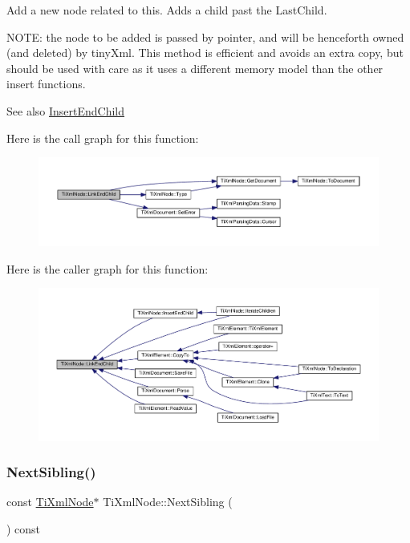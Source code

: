 Add a new node related to this. Adds a child past the Last\+Child.

N\+O\+TE\+: the node to be added is passed by pointer, and will be henceforth owned (and deleted) by tiny\+Xml. This method is efficient and avoids an extra copy, but should be used with care as it uses a different memory model than the other insert functions.

\begin{DoxySeeAlso}{See also}
\hyperlink{class_ti_xml_node_af287a913ce46d8dbf7ef24fec69bbaf0}{Insert\+End\+Child} 
\end{DoxySeeAlso}
Here is the call graph for this function\+:
\nopagebreak
\begin{figure}[H]
\begin{center}
\leavevmode
\includegraphics[width=350pt]{class_ti_xml_node_a1a881212554b759865f6cac79a851d38_cgraph}
\end{center}
\end{figure}
Here is the caller graph for this function\+:
\nopagebreak
\begin{figure}[H]
\begin{center}
\leavevmode
\includegraphics[width=350pt]{class_ti_xml_node_a1a881212554b759865f6cac79a851d38_icgraph}
\end{center}
\end{figure}
\mbox{\label{class_ti_xml_node_ae99c572ac7901a15993ea7a4efaa10e7}} 
\subsubsection{\texorpdfstring{Next\+Sibling()}{NextSibling()}\hspace{0.1cm}{\footnotesize\ttfamily [1/4]}}
{\footnotesize\ttfamily const \hyperlink{class_ti_xml_node}{Ti\+Xml\+Node}$\ast$ Ti\+Xml\+Node\+::\+Next\+Sibling (\begin{DoxyParamCaption}{ }\end{DoxyParamCaption}) const\hspace{0.3cm}{\ttfamily [inline]}}



